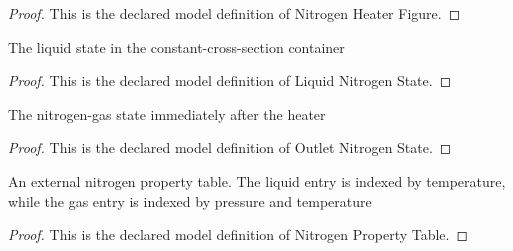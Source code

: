 \begin{proof}
  This is the declared model definition of Nitrogen Heater Figure.
\end{proof}
\begin{definition}
  \label{def:physics:phyx-mini-0445:phyxminiproblems-problemphyxmini0445-liquidnitrogenstate}
  The liquid state in the constant-cross-section container
\end{definition}
\begin{proof}
  This is the declared model definition of Liquid Nitrogen State.
\end{proof}
\begin{definition}
  \label{def:physics:phyx-mini-0445:phyxminiproblems-problemphyxmini0445-outletnitrogenstate}
  The nitrogen-gas state immediately after the heater
\end{definition}
\begin{proof}
  This is the declared model definition of Outlet Nitrogen State.
\end{proof}
\begin{definition}
  \label{def:physics:phyx-mini-0445:phyxminiproblems-problemphyxmini0445-nitrogenpropertytable}
  An external nitrogen property table. The liquid entry is indexed by temperature, while the gas entry is indexed by pressure and temperature
\end{definition}
\begin{proof}
  This is the declared model definition of Nitrogen Property Table.
\end{proof}
